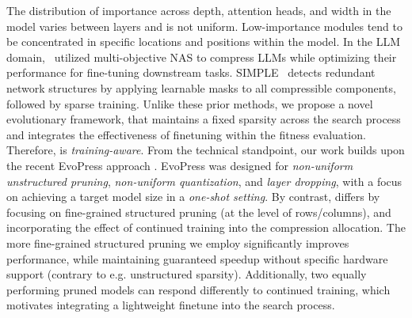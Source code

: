 The distribution of importance across depth, attention heads, and width in the model varies between layers and is not uniform. Low-importance modules tend to be concentrated in specific locations and positions within the model.
In the LLM domain,~\citet{Klein2023} utilized multi-objective NAS to compress LLMs while optimizing their performance for fine-tuning downstream tasks. 
SIMPLE~\cite{tao2023structured} detects redundant network structures by applying learnable masks to all compressible components, followed by sparse training.
Unlike these prior methods, we propose a novel evolutionary framework, that maintains a fixed sparsity across the search process and integrates the effectiveness of finetuning within the fitness evaluation. Therefore, \sysname{} is \emph{training-aware}.
From the technical standpoint, our work builds upon the recent EvoPress approach \cite{sieberling2024evopress}. EvoPress was designed for \emph{non-uniform unstructured pruning}, \emph{non-uniform quantization}, and \emph{layer dropping}, with a focus on achieving a target model size in a \emph{one-shot setting}. By contrast, \sysname{} differs by focusing on fine-grained structured pruning (at the level of rows/columns), and incorporating the effect of continued training into the compression allocation. The more fine-grained structured pruning we employ significantly improves performance, while maintaining guaranteed speedup without specific hardware support (contrary to e.g. unstructured sparsity). Additionally, two equally performing pruned models can respond differently to continued training, which motivates integrating a lightweight finetune into the search process.

